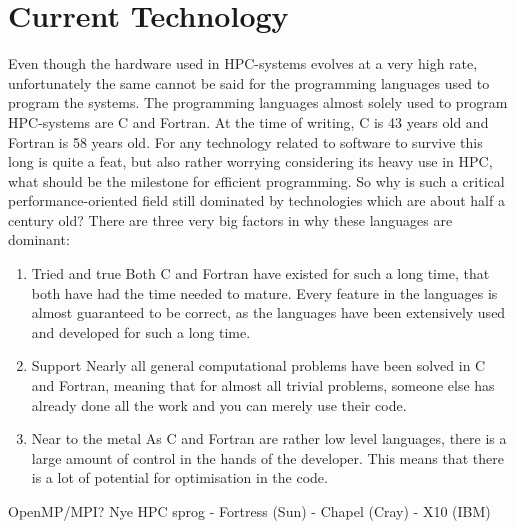 \section{Current Technology}
Even though the hardware used in HPC-systems evolves at a very high rate, unfortunately the same cannot be said for the programming languages used to program the systems. The programming languages almost solely used to program HPC-systems are C and Fortran. At the time of writing, C is 43 years old and Fortran is 58 years old. For any technology related to software to survive this long is quite a feat, but also rather worrying considering its heavy use in HPC, what should be the milestone for efficient programming. 
So why is such a critical performance-oriented field still dominated by technologies which are about half a century old? There are three very big factors in why these languages are dominant:
\begin{enumerate}
	\item Tried and true
	Both C and Fortran have existed for such a long time, that both have had the time needed to mature. Every feature in the languages is almost guaranteed to be correct, as the languages have been extensively used and developed for such a long time.
	\item Support
	Nearly all general computational problems have been solved in C and Fortran, meaning that for almost all trivial problems, someone else has already done all the work and you can merely use their code.
	\item Near to the metal
	As C and Fortran are rather low level languages, there is a large amount of control in the hands of the developer. This means that there is a lot of potential for optimisation in the code.
\end{enumerate}

OpenMP/MPI?
Nye HPC sprog
 - Fortress (Sun)
 - Chapel (Cray)
 - X10 (IBM)